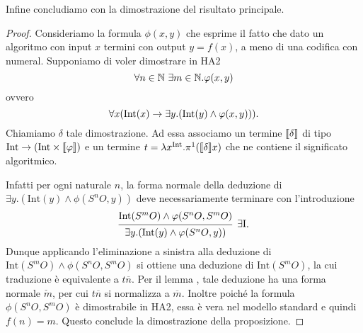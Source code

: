 \documentclass[]{marticle}
\begin{document}
Infine concludiamo con la dimostrazione del risultato principale.
\begin{proof}
    Consideriamo la formula $\phi(x,y)$ che esprime il fatto che dato un
    algoritmo con input $x$ termini con output $y=f(x)$, a meno di una codifica
    con numeral.  Supponiamo di voler dimostrare in HA2
    \[
        \forall n\in\mathbb{N}\ \exists m\in\mathbb{N} . \varphi(x,y)
    \]
    ovvero
    \[
        \forall x (\text{Int}(x)\rightarrow \exists y. (\text{Int}(y)\land \varphi(x,y))).
    \]
    Chiamiamo $\delta$ tale dimostrazione. Ad essa associamo un termine
    $\llbracket \delta \rrbracket$ di tipo $\text{Int}\rightarrow (\text{Int}\times\llbracket \varphi \rrbracket)$ e un termine $t =
    \lambda x^{\text{Int}}.\pi^1(\llbracket \delta \rrbracket x)$ che ne contiene il significato algoritmico.

    Infatti per ogni naturale $n$, la forma normale della deduzione di $\exists
    y.  (\text{Int}(y)\land \phi(S^nO,y))$ deve necessariamente terminare con
    l'introduzione
    \[
        \begin{prooftree}
            \hypo{\text{Int}(S^mO)\land \phi(S^nO,S^mO)} 
            \infer1[$\exists \text{I}$]{\exists y.(\text{Int}(y)\land
                \phi(S^nO,y))}
        \end{prooftree}.
    \]
    Dunque applicando l'eliminazione a sinistra alla deduzione di
    $\text{Int}(S^mO)\land \phi(S^nO,S^mO)$ si ottiene una deduzione di
    $\text{Int}(S^mO)$, la cui traduzione \`e equivalente a $t\overline{n}$. Per
    il lemma , tale deduzione ha una forma normale $\check{m}$, per cui
    $t \overline{n}$ si normalizza a $\overline{m}$. Inoltre poich\'e la formula
    $\phi(S^nO, S^mO)$ \`e dimostrabile in HA2, essa \`e vera nel modello
    standard e quindi $f(n)=m$. Questo conclude la dimostrazione della
    proposizione.
\end{proof}
\end{document}

